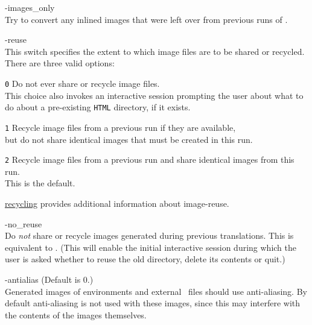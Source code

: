\begin{htmllist}
%
\item [ -images\_only\label{cs_imagesonly}]
\\
Try to convert any inlined images that were left over from previous
runs of \latextohtml.


%
\begin{changebar}
\item [ -reuse \Meta{reuse\_option}\label{cs_reuseoptions}]
\\
This switch specifies the extent to which image files are to be shared
or recycled.\html{\\}
There are three valid options:
%
\begin{htmllist}
%
\item [\texttt{0}]
Do not ever share or recycle image files.\\
This choice also invokes an interactive session
prompting the user about what to do about
a pre-existing \texttt{HTML} directory, if it exists.
%
%
\item [\texttt{1}]
Recycle image files from a previous run if they are available,\\
but do not share identical images that must be created in this run.
%
%
\item [\texttt{2}]
Recycle image files from a previous run and share identical
images from this run.\\
This is the default.
\end{htmllist}
\hyperref{A later section}{Section~}{}{recycling} provides
additional information about image-reuse.


%
\item [ -no\_reuse\label{cs_noreuse}]
\\
Do \emph{not} share or recycle images generated during previous translations.
This is equivalent to .
(This will enable the initial interactive session during which the user is
asked whether to reuse the old directory, delete its contents or quit.)%
\end{changebar}


%
\begin{changebar}
\item [ -antialias\label{cs_aalias}]
 (Default is 0.)\\
Generated images of  environments and external \PS\ files
should use anti-aliasing. By default anti-aliasing is not
used with these images, since this may interfere with the contents
of the images themselves.


\end{changebar}
\end{htmllist}
